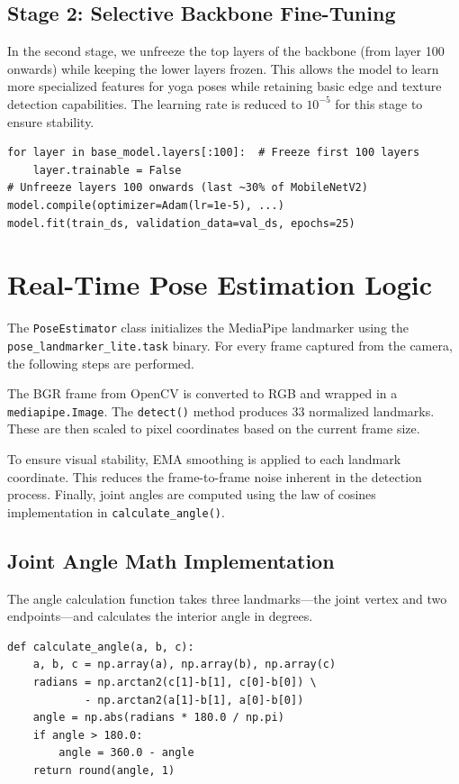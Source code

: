 \subsection{Stage 2: Selective Backbone Fine-Tuning}
In the second stage, we unfreeze the top layers of the backbone (from layer 100 onwards) while keeping the lower layers frozen. This allows the model to learn more specialized features for yoga poses while retaining basic edge and texture detection capabilities. The learning rate is reduced to $10^{-5}$ for this stage to ensure stability.
\begin{verbatim}
for layer in base_model.layers[:100]:  # Freeze first 100 layers
    layer.trainable = False
# Unfreeze layers 100 onwards (last ~30% of MobileNetV2)
model.compile(optimizer=Adam(lr=1e-5), ...)
model.fit(train_ds, validation_data=val_ds, epochs=25)
\end{verbatim}

\section{Real-Time Pose Estimation Logic}
The \texttt{PoseEstimator} class initializes the MediaPipe landmarker using the \texttt{pose\_landmarker\_lite.task} binary. For every frame captured from the camera, the following steps are performed.

The BGR frame from OpenCV is converted to RGB and wrapped in a \texttt{mediapipe.Image}. The \texttt{detect()} method produces 33 normalized landmarks. These are then scaled to pixel coordinates based on the current frame size.

To ensure visual stability, EMA smoothing is applied to each landmark coordinate. This reduces the frame-to-frame noise inherent in the detection process. Finally, joint angles are computed using the law of cosines implementation in \texttt{calculate\_angle()}.

\subsection{Joint Angle Math Implementation}
The angle calculation function takes three landmarks—the joint vertex and two endpoints—and calculates the interior angle in degrees.
\begin{verbatim}
def calculate_angle(a, b, c):
    a, b, c = np.array(a), np.array(b), np.array(c)
    radians = np.arctan2(c[1]-b[1], c[0]-b[0]) \
            - np.arctan2(a[1]-b[1], a[0]-b[0])
    angle = np.abs(radians * 180.0 / np.pi)
    if angle > 180.0:
        angle = 360.0 - angle
    return round(angle, 1)
\end{verbatim}

